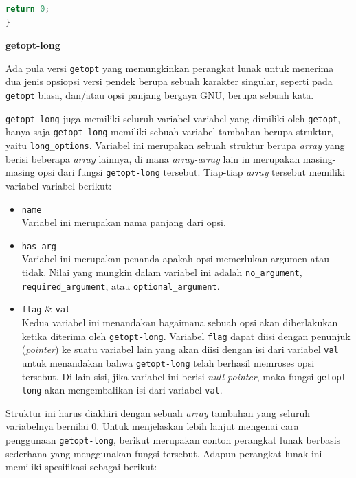 \documentclass[a4paper,twoside]{article}
\begin{document}
\begin{enumerate}
\begin{lstlisting}[language=C, caption=Contoh sederhana penggunaan getopt, label=code:getopt-usage]
    return 0;
}
\end{lstlisting}

\textbf{getopt-long}
\label{sec:cmodules-getopt-long}

Ada pula versi \verb|getopt| yang memungkinkan perangkat lunak untuk menerima dua jenis opsi\textemdash opsi versi pendek berupa sebuah karakter singular, seperti pada \verb|getopt| biasa, dan/atau opsi panjang bergaya GNU, berupa sebuah kata.

\verb|getopt-long| juga memiliki seluruh variabel-variabel yang dimiliki oleh \verb|getopt|, hanya saja \linebreak \verb|getopt-long| memiliki sebuah variabel tambahan berupa struktur, yaitu \verb|long_options|. Variabel ini merupakan sebuah struktur berupa \textit{array} yang berisi beberapa \textit{array} lainnya, di mana \textit{array-array} lain in merupakan masing-masing opsi dari fungsi \verb|getopt-long| tersebut. Tiap-tiap \textit{array} tersebut memiliki variabel-variabel berikut:

\begin{itemize}
	\item \verb|name|\\
	Variabel ini merupakan nama panjang dari opsi.
	\item \verb|has_arg|\\
	Variabel ini merupakan penanda apakah opsi memerlukan argumen atau tidak. Nilai yang \linebreak mungkin dalam variabel ini adalah \verb|no_argument|, \verb|required_argument|, atau \verb|optional_argument|.
	\item \verb|flag| \& \verb|val|\\ 
	Kedua variabel ini menandakan bagaimana sebuah opsi akan diberlakukan ketika diterima oleh \verb|getopt-long|. Variabel \verb|flag| dapat diisi dengan penunjuk (\textit{pointer}) ke suatu variabel lain yang akan diisi dengan isi dari variabel \verb|val| untuk menandakan bahwa \verb|getopt-long| telah berhasil memroses opsi tersebut. Di lain sisi, jika variabel ini berisi \textit{null pointer}, maka fungsi \verb|getopt-long| akan mengembalikan isi dari variabel \verb|val|.
\end{itemize}
\noindent
Struktur ini harus diakhiri dengan sebuah \textit{array} tambahan yang seluruh variabelnya bernilai 0.
\newline\newline
Untuk menjelaskan lebih lanjut mengenai cara penggunaan \verb|getopt-long|, berikut merupakan \linebreak contoh perangkat lunak berbasis \cl sederhana yang menggunakan fungsi tersebut. Adapun perangkat lunak ini memiliki spesifikasi sebagai berikut:


\end{enumerate}
\end{document}
